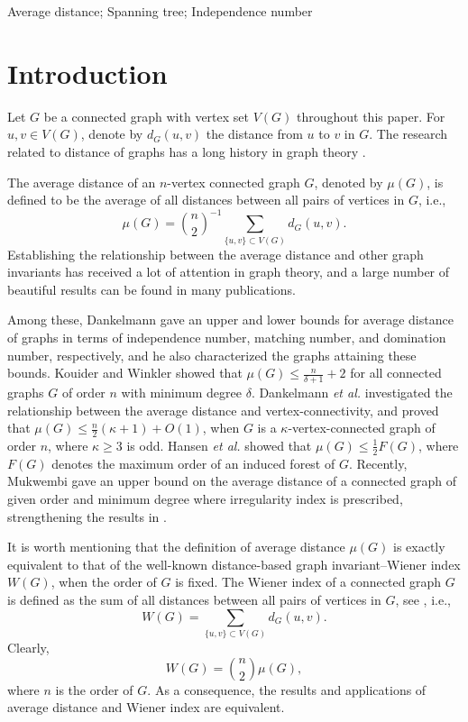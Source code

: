 \documentclass[12pt]{article}
\begin{document}
 Average distance; Spanning tree; Independence number



\section{Introduction}

Let $G$ be a connected graph with vertex set $V(G)$ throughout this paper. For $u,v \in V(G)$, denote by $d_G(u,v)$ the distance from $u$ to $v$ in $G$. The research related to distance of graphs has a long history in graph theory \cite{BuHa90}.

The average distance of an $n$-vertex connected graph $G$, denoted by $\mu(G)$, is defined to be the average of all distances between all pairs of vertices in $G$, i.e.,
$$
\mu (G) = \binom{n}{2}^{-1} \sum_{\{u,v\} \subset V(G)}d_G(u,v).
$$
Establishing the relationship between the average distance and other graph invariants has received a lot of attention in graph theory, and a large number of beautiful results can be found in many publications.

Among these, Dankelmann \cite{Dan94,Dan97} gave an upper and lower bounds for average distance of graphs in terms of independence number, matching number, and domination number, respectively, and he also characterized the graphs attaining these bounds. Kouider and Winkler \cite{KoWi97} showed that $\mu (G) \le \frac{n}{\delta + 1} + 2$ for all connected graphs $G$ of order $n$ with minimum degree $\delta$.
Dankelmann {\it et al.} \cite{DaMuSw09}
investigated the relationship between the average distance and vertex-connectivity, and proved that $\mu (G) \le \frac{n}{2} (\kappa + 1) + O(1)$, when $G$ is a $\kappa$-vertex-connected graph of order $n$, where $\kappa \ge 3$ is odd.
Hansen {\it et al.} \cite{HaHeKiMaSc09} showed that $\mu (G) \le \frac{1}{2} F(G)$, where $F(G)$ denotes the maximum order of an induced forest of $G$.
Recently, Mukwembi \cite{Muk24} gave an upper bound on the average distance of a connected graph of given order and minimum degree where irregularity index is prescribed, strengthening the results in \cite{DaEn00,KoWi97}.

It is worth mentioning that the definition of average distance $\mu (G)$ is exactly equivalent to that of the well-known distance-based graph invariant--Wiener index $W(G)$, when the order of $G$ is fixed. The Wiener index of a connected graph $G$ is defined as the sum of all distances between all pairs of vertices in $G$, see \cite{Win47}, i.e.,
$$
W (G) = \sum_{\{u,v\} \subset V(G)}d_G(u,v).
$$
Clearly,
$$
W(G) = \binom{n}{2} \mu(G),
$$
where $n$ is the order of $G$.
As a consequence, the results and applications of average distance and Wiener index are equivalent.
\end{document}
